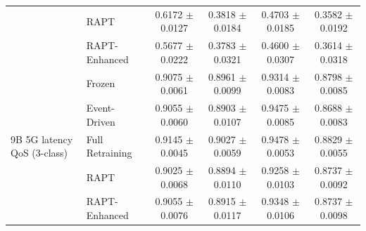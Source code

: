 \begin{table}[t]
\begin{tabular}{llcccc}
 & RAPT            & 0.6172 $\pm$ 0.0127 & 0.3818 $\pm$ 0.0184 & 0.4703 $\pm$ 0.0185 & 0.3582 $\pm$ 0.0192 \\
 & RAPT-Enhanced   & 0.5677 $\pm$ 0.0222 & 0.3783 $\pm$ 0.0321 & 0.4600 $\pm$ 0.0307 & 0.3614 $\pm$ 0.0318 \\
\midrule
\multirow{5}{*}{9B 5G latency QoS (3-class)}
 & Frozen          & 0.9075 $\pm$ 0.0061 & 0.8961 $\pm$ 0.0099 & 0.9314 $\pm$ 0.0083 & 0.8798 $\pm$ 0.0085 \\
 & Event-Driven    & 0.9055 $\pm$ 0.0060 & 0.8903 $\pm$ 0.0107 & 0.9475 $\pm$ 0.0085 & 0.8688 $\pm$ 0.0083 \\
 & Full Retraining & 0.9145 $\pm$ 0.0045 & 0.9027 $\pm$ 0.0059 & 0.9478 $\pm$ 0.0053 & 0.8829 $\pm$ 0.0055 \\
 & RAPT            & 0.9025 $\pm$ 0.0068 & 0.8894 $\pm$ 0.0110 & 0.9258 $\pm$ 0.0103 & 0.8737 $\pm$ 0.0092 \\
 & RAPT-Enhanced   & 0.9055 $\pm$ 0.0076 & 0.8915 $\pm$ 0.0117 & 0.9348 $\pm$ 0.0106 & 0.8737 $\pm$ 0.0098 \\
\bottomrule
\end{tabular}
\end{table}

